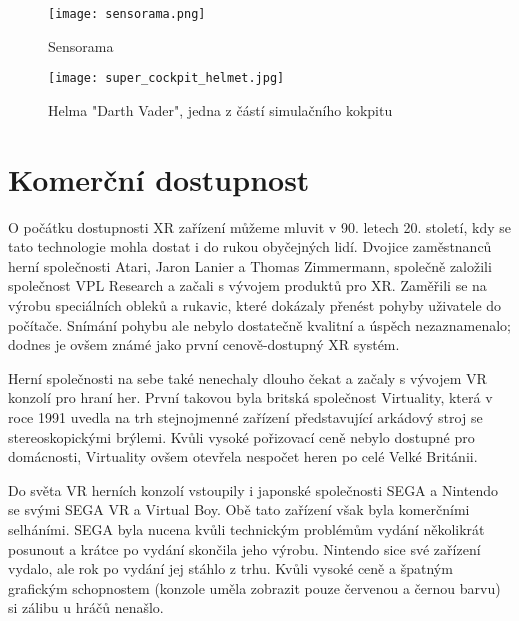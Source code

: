 \begin{figure}[H]
    \centering

    \begin{minipage}{.5\textwidth}
        \centering
        \texttt{[image: sensorama.png]}
        \caption{Sensorama \cite{sensorama_patent}}
        \label{sensorama_fig}
    \end{minipage}%
    \begin{minipage}{.5\textwidth}
        \centering
        \texttt{[image: super\_cockpit\_helmet.jpg]}
        \caption{Helma "Darth Vader", jedna z částí simulačního kokpitu \cite{super_cockpit_image}}
        \label{sensorama}
    \end{minipage}

\end{figure}

\section{Komerční dostupnost}

O počátku dostupnosti XR zařízení můžeme mluvit v 90. letech 20. století, kdy se tato technologie mohla dostat i do rukou obyčejných lidí. Dvojice zaměstnanců herní společnosti Atari, Jaron Lanier a Thomas Zimmermann, společně založili společnost VPL Research a začali s vývojem produktů pro XR. Zaměřili se na výrobu speciálních obleků a rukavic, které dokázaly přenést pohyby uživatele do počítače. Snímání pohybu ale nebylo dostatečně kvalitní a úspěch nezaznamenalo; dodnes je ovšem známé jako první cenově-dostupný XR systém. \cite{otechnice_2}

Herní společnosti na sebe také nenechaly dlouho čekat a začaly s vývojem VR konzolí pro hraní her. První takovou byla britská společnost Virtuality, která v roce 1991 uvedla na trh stejnojmenné zařízení představující arkádový stroj se stereoskopickými brýlemi. Kvůli vysoké pořizovací ceně nebylo dostupné pro domácnosti, Virtuality ovšem otevřela nespočet heren po celé Velké Británii. \cite{otechnice_2} \cite{independent_virtuality}

Do světa VR herních konzolí vstoupily i japonské společnosti SEGA a Nintendo se svými SEGA VR a Virtual Boy. Obě tato zařízení však byla komerčními selháními. SEGA byla nucena kvůli technickým problémům vydání několikrát posunout a krátce po vydání skončila jeho výrobu. Nintendo sice své zařízení vydalo, ale rok po vydání jej stáhlo z trhu. Kvůli vysoké ceně a špatným grafickým schopnostem (konzole uměla zobrazit pouze červenou a černou barvu) si zálibu u hráčů nenašlo.\cite{otechnice_2}

